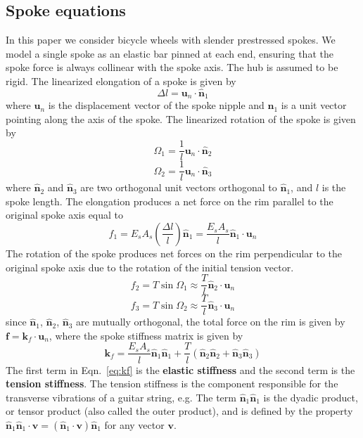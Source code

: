 \documentclass{bmd2016p}
\newcommand{\n}{\ensuremath{\hat{\bm{n}}_1}}
\newcommand{\nn}{\ensuremath{\hat{\bm{n}}_2}}
\newcommand{\nnn}{\ensuremath{\hat{\bm{n}}_3}}
\begin{document}
\subsection{Spoke equations}

In this paper we consider bicycle wheels with slender prestressed spokes. We model a single spoke as an elastic bar pinned at each end, ensuring that the spoke force is always collinear with the spoke axis. The hub is assumed to be rigid. The linearized elongation of a spoke is given by
	\begin{equation}\label{eq:selong}
	\Delta l = \bm{u}_n\cdot \n
	\end{equation}
where $\bm{u}_n$ is the displacement vector of the spoke nipple and \n{} is a unit vector pointing along the axis of the spoke. The linearized rotation of the spoke is given by
	\begin{equation}\label{eq:srot1}
	\Omega_1 = \frac{1}{l} \bm{u}_n\cdot \nn
	\end{equation}
	\begin{equation}\label{eq:srot2}
	\Omega_2 = \frac{1}{l} \bm{u}_n\cdot \nnn
	\end{equation}
where \nn{} and \nnn{} are two orthogonal unit vectors orthogonal to \n{}, and $l$ is the spoke length. The elongation produces a net force on the rim parallel to the original spoke axis equal to
	\begin{equation}\label{eq:sF1}
	f_1 = E_sA_s\left(\frac{\Delta l}{l}\right)\n = \frac{E_sA_s}{l} \n \cdot \bm{u}_n 
	\end{equation}
The rotation of the spoke produces net forces on the rim perpendicular to the original spoke axis due to the rotation of the initial tension vector.
	\begin{equation}\label{eq:sF2}
	f_2 = T \sin{\Omega_1} \approx \frac{T}{l} \nn \cdot \bm{u}_n
	\end{equation}
	\begin{equation}\label{eq:sF3}
	f_3 = T \sin{\Omega_2} \approx \frac{T}{l} \nnn \cdot \bm{u}_n
	\end{equation}
since \n{}, \nn{}, \nnn{} are mutually orthogonal, the total force on the rim is given by $\bm{f} = \bm{k}_f \cdot \bm{u}_n$, where the spoke stiffness matrix is given by
	\begin{equation}\label{eq:kf}
	\bm{k}_f = \frac{E_sA_s}{l}\n\n + \frac{T}{l}(\nn\nn + \nnn\nnn)
	\end{equation}
The first term in Eqn.~\ref{eq:kf} is the {\bf elastic stiffness} and the second term is the {\bf tension stiffness}. The tension stiffness is the component responsible for the transverse vibrations of a guitar string, e.g. The term $\n\n$ is the dyadic product, or tensor product (also called the outer product), and is defined by the property $\n\n\cdot \bm{v} = (\n\cdot \bm{v})\n$ for any vector $\bm{v}$.
\end{document}
